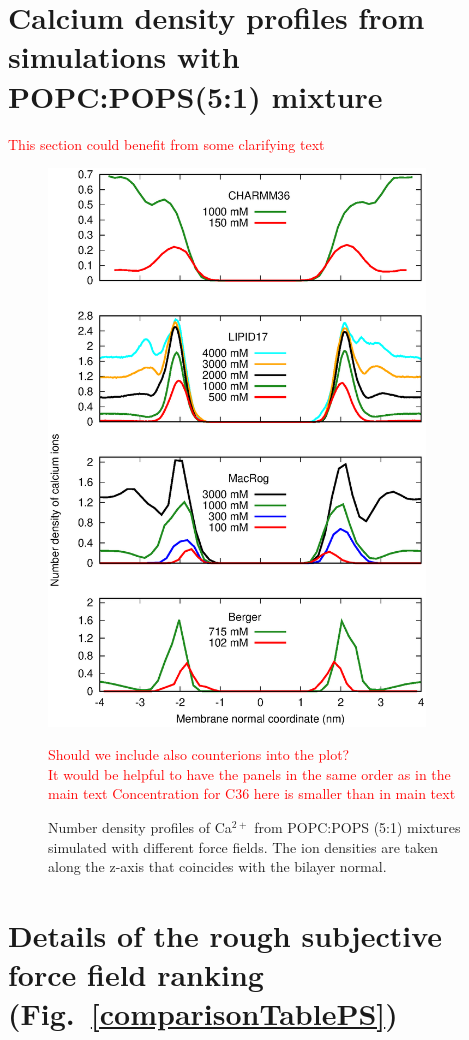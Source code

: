 \documentclass[journal=jpcbfk]{achemso}
\newcommand{\todo}[1]{\textcolor{red}{#1}}
\begin{document}
\section{Calcium density profiles from simulations with \\ POPC:POPS(5:1) mixture}
\todo{This section could benefit from some clarifying text}
\begin{figure}[ht]
  \centering
  \includegraphics[width=10cm]{../Figs/CAdensPCPSmixture.eps}
  \caption{\label{CAdensPCPSmixtureALL}
    Number density profiles of Ca$^{2+}$ from POPC:POPS (5:1) mixtures simulated with different force fields. The ion densities are taken along the z-axis that coincides with the bilayer normal. 
  }
  \todo{Should we include also counterions into the plot?} \\
  \todo{It would be helpful to have the panels in the same order as in the main text}
  \todo{Concentration for C36 here is smaller than in main text} 
 	
  
\end{figure}

\pagebreak
\section{Details of the rough subjective force field ranking (Fig.~\ref{comparisonTablePS})} 
\end{document}
